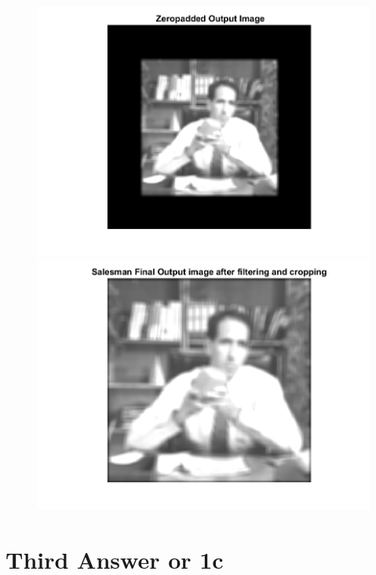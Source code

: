 \documentclass[11pt]{article} %
\begin{document}
\begin{figure}
\centering
	\includegraphics{1bg.png}
	\includegraphics{1bh.png}
\end{figure}
\clearpage

\section {Third Answer or 1c}
\end{document}
